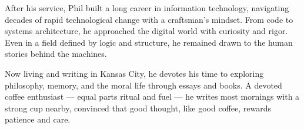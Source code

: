 \documentclass[12pt]{article} \usepackage[margin=1in]{geometry}
\begin{document}
After his service, Phil built a long career in information technology,
navigating decades of rapid technological change with a craftsman’s
mindset. From code to systems architecture, he approached the digital
world with curiosity and rigor. Even in a field defined by logic and
structure, he remained drawn to the human stories behind the machines.

Now living and writing in Kansas City, he devotes his time to exploring
philosophy, memory, and the moral life through essays and books.
A devoted coffee enthusiast — equal parts ritual and fuel — he writes
most mornings with a strong cup nearby, convinced that good thought,
like good coffee, rewards patience and care.
\end{document}
